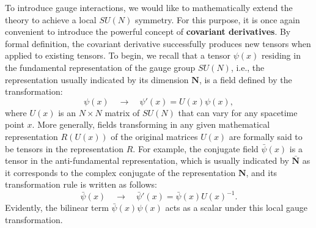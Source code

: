 To introduce gauge interactions, we would like to mathematically extend the theory to achieve a local \(SU(N)\) symmetry. For this purpose, it is once again convenient to introduce the powerful concept of \textbf{covariant derivatives}. By formal definition, the covariant derivative successfully produces new tensors when applied to existing tensors. To begin, we recall that a tensor \(\psi(x)\) residing in the fundamental representation of the gauge group \(SU(N)\), i.e., the representation usually indicated by its dimension \(\mathbf{N}\), is a field defined by the transformation:
\[
    \psi(x) \quad \rightarrow \quad \psi'(x) = U(x)\psi(x),
\]
where \(U(x)\) is an \(N \times N\) matrix of \(SU(N)\) that can vary for any spacetime point \(x\). More generally, fields transforming in any given mathematical representation \(R(U(x))\) of the original matrices \(U(x)\) are formally said to be tensors in the representation \(R\). For example, the conjugate field \(\bar{\psi}(x)\) is a tensor in the anti-fundamental representation, which is usually indicated by \(\bar{\mathbf{N}}\) as it corresponds to the complex conjugate of the representation \(\mathbf{N}\), and its transformation rule is written as follows:
\[
    \bar{\psi}(x) \quad \rightarrow \quad \bar{\psi}'(x) = \bar{\psi}(x)U(x)^{-1}.
\]
Evidently, the bilinear term \(\bar{\psi}(x)\psi(x)\) acts as a scalar under this local gauge transformation.

